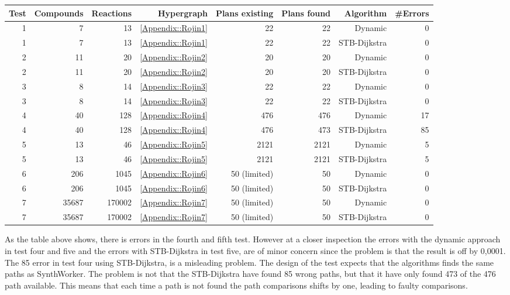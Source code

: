 \documentclass[a4paper,10pt,titlepage]{paper}
\begin{document}
\begin{table}[H]
\hspace{-2.5cm}
\begin{tabular}{|r|r|r|r|r|r|r|r|}
\hline
Test & Compounds & Reactions & Hypergraph & Plans existing & Plans found & Algorithm & \#Errors\\\hline
1 & 7 & 13 & \ref{Appendix::Rojin1} & 22 & 22 & Dynamic & 0\\\hline
1 & 7 & 13 & \ref{Appendix::Rojin1} & 22 & 22 & STB-Dijkstra & 0\\\hline
2 & 11 & 20 & \ref{Appendix::Rojin2}  & 20 & 20 & Dynamic & 0\\\hline
2 & 11 & 20 & \ref{Appendix::Rojin2} & 20 & 20 & STB-Dijkstra & 0\\\hline
3 & 8 & 14 & \ref{Appendix::Rojin3} & 22 & 22 & Dynamic & 0\\\hline
3 & 8 & 14 & \ref{Appendix::Rojin3} & 22 & 22 & STB-Dijkstra & 0\\\hline
4 & 40 & 128 & \ref{Appendix::Rojin4} & 476 & 476 & Dynamic & 17\\\hline
4 & 40 & 128 & \ref{Appendix::Rojin4} & 476 & 473 & STB-Dijkstra & 85\\\hline
5 & 13 & 46 & \ref{Appendix::Rojin5} & 2121 & 2121 & Dynamic & 5\\\hline
5 & 13 & 46 & \ref{Appendix::Rojin5} & 2121 & 2121 & STB-Dijkstra & 5\\\hline
6 & 206 & 1045 & \ref{Appendix::Rojin6} & 50 (limited) & 50 & Dynamic & 0 \\\hline
6 & 206 & 1045 & \ref{Appendix::Rojin6} & 50 (limited) & 50 & STB-Dijkstra & 0 \\\hline
7 & 35687 & 170002 & \ref{Appendix::Rojin7} & 50 (limited) & 50 & Dynamic & 0 \\\hline
7 & 35687 & 170002 & \ref{Appendix::Rojin7} & 50 (limited) & 50 & STB-Dijkstra & 0 \\\hline
\end{tabular}
\end{table}

As the table above shows, there is errors in the fourth and fifth test. However at a closer inspection the errors with the dynamic approach in test four and five and the errors with STB-Dijkstra in test five, are of minor concern since the problem is that the result is off by 0,0001. The 85 error in test four using STB-Dijkstra, is a misleading problem. The design of the test expects that the algorithms finds the same paths as SynthWorker. The problem is not that the STB-Dijkstra have found 85 wrong paths, but that it have only found 473 of the 476 path available. This means that each time a path is not found the path comparisons shifts by one, leading to faulty comparisons.\\
\end{document}
